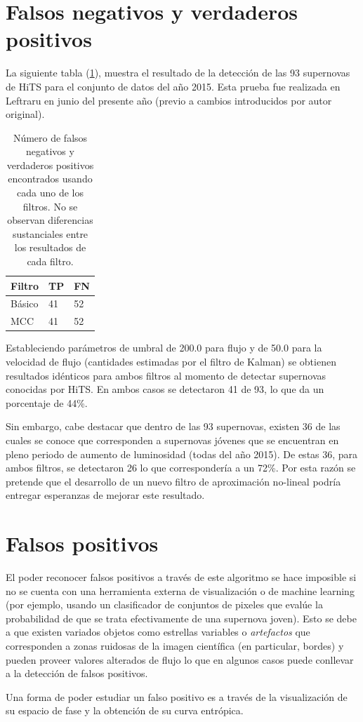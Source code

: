 \section{Falsos negativos y verdaderos positivos}
La siguiente tabla (\ref{tab:tpfn}), muestra el resultado de la detecci\'on de las 93 supernovas de HiTS para el conjunto de datos del a\~no 2015. Esta prueba fue realizada en Leftraru en junio del presente a\~no (previo a cambios introducidos por autor original). 
\begin{table}[h!]
\centering
\begin{tabular}{|l|l|l|}
\hline
\textbf{Filtro} & \textbf{TP} & \textbf{FN} \\ \hline
Básico          & 41          & 52          \\ \hline
MCC             & 41          & 52          \\ \hline
\end{tabular}
\caption{N\'umero de falsos negativos y verdaderos positivos encontrados usando cada uno de los filtros. No se observan diferencias sustanciales entre los resultados de cada filtro.}
\label{tab:tpfn}
\end{table}

Estableciendo par\'ametros de umbral de 200.0 para flujo y de 50.0 para la velocidad de flujo (cantidades estimadas por el filtro de Kalman) se obtienen resultados id\'enticos para ambos filtros al momento de detectar supernovas conocidas por HiTS. En ambos casos se detectaron 41 de 93, lo que da un porcentaje de 44\%.
\bigskip

Sin embargo, cabe destacar que dentro de las 93 supernovas, existen 36 de las cuales se conoce que corresponden a supernovas j\'ovenes que se encuentran en pleno periodo de aumento de luminosidad (todas del a\~no 2015). De estas 36, para ambos filtros, se detectaron 26 lo que corresponder\'ia a un 72\%. Por esta raz\'on se pretende que el desarrollo de un nuevo filtro de aproximaci\'on no-lineal podr\'ia entregar esperanzas de mejorar este resultado.
\bigskip

\section{Falsos positivos}
El poder reconocer falsos positivos a trav\'es de este algoritmo se hace imposible si no se cuenta con una herramienta externa de visualizaci\'on o de machine learning (por ejemplo, usando un clasificador de conjuntos de pixeles que eval\'ue la probabilidad de que se trata efectivamente de una supernova joven). Esto se debe a que existen variados objetos como estrellas variables o \textit{artefactos} que corresponden a zonas ruidosas de la imagen  cient\'ifica (en particular, bordes) y pueden proveer valores alterados de flujo lo que en algunos casos puede conllevar a la detecci\'on de falsos positivos.
\bigskip

Una forma de poder estudiar un falso positivo es a trav\'es de la visualizaci\'on de su espacio de fase y la obtenci\'on de su curva entr\'opica.